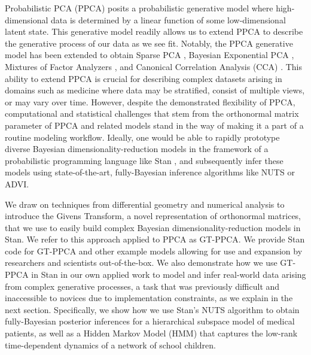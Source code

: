 \documentclass{article}
\begin{document}
Probabilistic PCA (PPCA) \citep{tipping1999probabilistic} posits a probabilistic generative model where high-dimensional data is determined by a linear function of some low-dimensional latent state. This generative model readily allows us to extend PPCA to describe the generative process of our data as we see fit. Notably, the PPCA generative model has been extended to obtain Sparse PCA \citep{hoff2009simulation}, Bayesian Exponential PCA \citep{mohamed2009bayesian}, Mixtures of Factor Analyzers \citep{ghahramani1996algorithm}, and Canonical Correlation Analysis (CCA) \citep[chapt.~12.5]{murphy2012machine}. This ability to extend PPCA is crucial for describing complex datasets arising in domains such as medicine where data may be stratified, consist of multiple views, or may vary over time. However, despite the demonstrated flexibility of PPCA, computational and statistical challenges that stem from the orthonormal matrix parameter of PPCA and related models stand in the way of making it a part of a routine modeling workflow. Ideally, one would be able to rapidly prototype diverse Bayesian dimensionality-reduction models in the framework of a probabilistic programming language like Stan \citep{carpenter2016stan}, and subsequently infer these models using state-of-the-art, fully-Bayesian inference algorithms like NUTS or ADVI. 

We draw on techniques from differential geometry and numerical analysis to introduce the Givens Transform, a novel representation of orthonormal matrices, that we use to easily build complex Bayesian dimensionality-reduction models in Stan. We refer to this approach applied to PPCA as GT-PPCA. We provide Stan code for GT-PPCA and other example models allowing for use and expansion by researchers and scientists out-of-the-box. We also demonstrate how we use GT-PPCA in Stan in our own applied work to model and infer real-world data arising from complex generative processes, a task that was previously difficult and inaccessible to novices due to implementation constraints, as we explain in the next section. Specifically, we show how we use Stan's NUTS algorithm to obtain fully-Bayesian posterior inferences for a hierarchical subspace model of medical patients, as well as a Hidden Markov Model (HMM) that captures the low-rank time-dependent dynamics of a network of school children.
\end{document}
